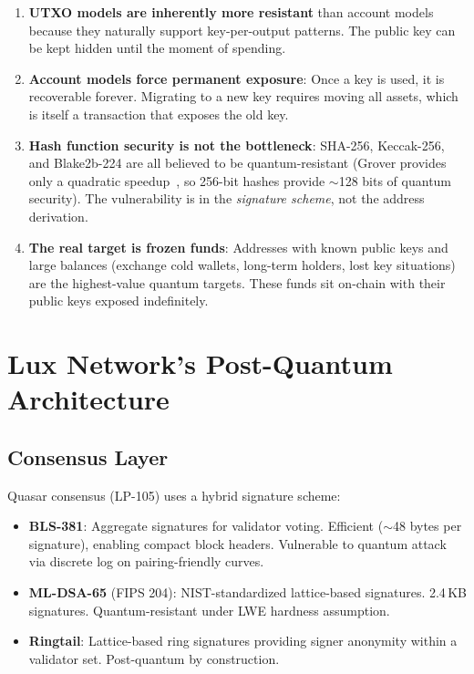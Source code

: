 \documentclass[11pt,a4paper]{article}
\begin{document}
\begin{enumerate}[nosep]
  \item \textbf{UTXO models are inherently more resistant} than account
        models because they naturally support key-per-output patterns.
        The public key can be kept hidden until the moment of spending.
  \item \textbf{Account models force permanent exposure}: Once a key
        is used, it is recoverable forever. Migrating to a new key
        requires moving all assets, which is itself a transaction that
        exposes the old key.
  \item \textbf{Hash function security is not the bottleneck}: SHA-256,
        Keccak-256, and Blake2b-224 are all believed to be
        quantum-resistant (Grover provides only a quadratic
        speedup~\cite{grover1996}, so 256-bit hashes provide $\sim$128
        bits of quantum security). The vulnerability is in the
        \emph{signature scheme}, not the address derivation.
  \item \textbf{The real target is frozen funds}: Addresses with known
        public keys and large balances (exchange cold wallets, long-term
        holders, lost key situations) are the highest-value quantum
        targets. These funds sit on-chain with their public keys
        exposed indefinitely.
\end{enumerate}

\section{Lux Network's Post-Quantum Architecture}

\subsection{Consensus Layer}

Quasar consensus (LP-105) uses a hybrid signature scheme:

\begin{itemize}[nosep]
  \item \textbf{BLS-381}: Aggregate signatures for validator voting.
        Efficient ($\sim$48 bytes per signature), enabling compact block
        headers. Vulnerable to quantum attack via discrete log on
        pairing-friendly curves.
  \item \textbf{ML-DSA-65} (FIPS 204): NIST-standardized lattice-based
        signatures. 2.4\,KB signatures. Quantum-resistant under LWE
        hardness assumption.
  \item \textbf{Ringtail}: Lattice-based ring signatures providing
        signer anonymity within a validator set. Post-quantum by
        construction.
\end{itemize}
\end{document}
